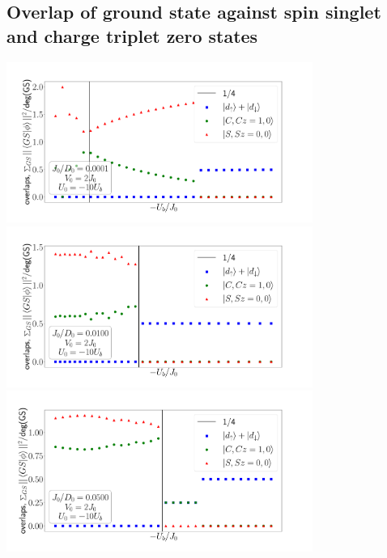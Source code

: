 \documentclass[10pt]{report}
\numberwithin{equation}{section}
\begin{document}
\subsection*{Overlap of ground state against spin singlet and charge triplet zero states}
\begin{center}
	\includegraphics[width=0.75\textwidth]{../figures/overlaps_gs-J=0.100.pdf}\\
	\includegraphics[width=0.75\textwidth]{../figures/overlaps_gs-J=10.000.pdf}\\
	\includegraphics[width=0.75\textwidth]{../figures/overlaps_gs-J=50.000.pdf}
\end{center}
\end{document}

